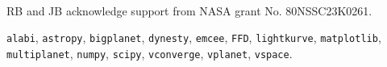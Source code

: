 \documentclass[preprint]{aastex631}
\begin{document}
\vspace{1cm}

\\
RB and JB acknowledge support from NASA grant No. 80NSSC23K0261.

\vspace{1cm}

 \texttt{alabi}, \texttt{astropy}, \texttt{bigplanet}, \texttt{dynesty}, \texttt{emcee}, \texttt{FFD}, \texttt{lightkurve}, \texttt{matplotlib}, \texttt{multiplanet}, \texttt{numpy}, \texttt{scipy}, \texttt{vconverge}, \texttt{vplanet},  \texttt{vspace}.



\end{document}
